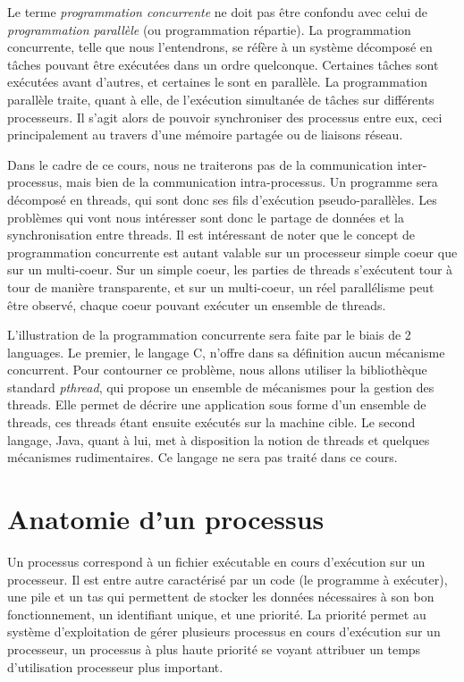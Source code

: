 Le terme \emph{programmation concurrente} ne doit pas être confondu avec celui de \emph{programmation parallèle} (ou programmation répartie). La programmation concurrente, telle que nous l'entendrons, se réfère à un système décomposé en tâches pouvant être exécutées dans un ordre quelconque. Certaines tâches sont exécutées avant d'autres, et certaines le sont en parallèle. La programmation parallèle traite, quant à elle, de l'exécution simultanée de tâches sur différents processeurs. Il s'agit alors de pouvoir synchroniser des processus entre eux, ceci principalement au travers d'une mémoire partagée ou de liaisons réseau.

Dans le cadre de ce cours, nous ne traiterons pas de la communication inter-processus, mais bien de la communication intra-processus. Un programme sera décomposé en threads, qui sont donc ses fils d'exécution pseudo-parallèles. Les problèmes qui vont nous intéresser sont donc le partage de données et la synchronisation entre threads. Il est intéressant de noter que le concept de programmation concurrente est autant valable sur un processeur simple coeur que sur un multi-coeur. Sur un simple coeur, les parties de threads s'exécutent tour à tour de manière transparente, et sur un multi-coeur, un réel parallélisme peut être observé, chaque coeur pouvant exécuter un ensemble de threads.

L'illustration de la programmation concurrente sera faite par le biais de 2 languages. Le premier, le langage C, n'offre dans sa définition aucun mécanisme concurrent. Pour contourner ce problème, nous allons utiliser la bibliothèque standard \emph{pthread}, qui propose un ensemble de mécanismes pour la gestion des threads. Elle permet de décrire une application sous forme d'un ensemble de threads, ces threads étant ensuite exécutés sur la machine cible. Le second langage, Java, quant à lui, met à disposition la notion de threads et quelques mécanismes rudimentaires. Ce langage ne sera pas traité dans ce cours.

\section{Anatomie d'un processus}

Un processus correspond à un fichier exécutable en cours d'exécution sur un processeur. Il est entre autre caractérisé par un code (le programme à exécuter), une pile et un tas qui permettent de stocker les données nécessaires à son bon fonctionnement, un identifiant unique, et une priorité. La priorité permet au système d'exploitation de gérer plusieurs processus en cours d'exécution sur un processeur, un processus à plus haute priorité se voyant attribuer un temps d'utilisation processeur plus important.

